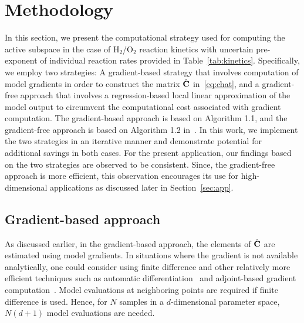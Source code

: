 \section{Methodology}
\label{sec:method}

In this section, we present the computational strategy used for computing the
active subspace in the case of H$_2$/O$_2$ reaction kinetics with uncertain
pre-exponent of individual reaction rates provided in Table~\ref{tab:kinetics}.
Specifically, we employ two strategies: 
A gradient-based strategy that involves computation of model
gradients in order to construct the matrix $\hat{\mathbf{{C}}}$
in~\eqref{eq:chat}, and a gradient-free approach 
that involves a regression-based local linear approximation of
the model output to circumvent the computational cost associated with gradient
computation. 
The gradient-based approach is based on Algorithm
1.1, and the gradient-free approach is based on Algorithm 1.2
in~\cite{Constantine:2015}. In this work, we implement the two
strategies in an iterative manner and demonstrate potential for
additional savings in both cases.  For the present application,
our findings based on the two strategies are observed to be consistent.  
Since,
the gradient-free approach is more efficient, this observation
encourages its use for high-dimensional applications as discussed later in
Section~\ref{sec:app}. 

\subsection{Gradient-based approach}
\label{sub:grad}

As discussed earlier, in the gradient-based approach, the elements of
$\hat{\mathbf{{C}}}$ are estimated using model gradients.  In situations where the
gradient is not available analytically, one could consider using finite
difference and other relatively more efficient techniques such as automatic
differentiation~\cite{Kiparissides:2009} and adjoint-based gradient
computation~\cite{Jameson:1988,Gunzburger:2003,Borzi:2011,Alexanderian:2017}.
Model evaluations at neighboring points are required if finite difference is
used. Hence, for $N$ samples in a $d$-dimensional parameter space, $N(d+1)$
model evaluations are needed. 

